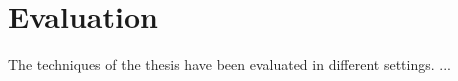 \chapter{Evaluation\label{chapter:evaluation}}

The techniques of the thesis have been evaluated in different settings. ...



